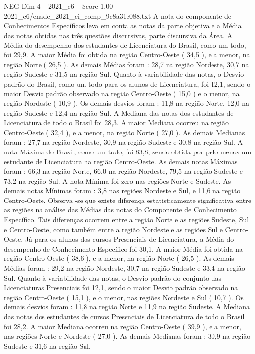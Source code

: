 \begin{textsample}{NEG Dim 4 – 2021\_c6 – Score 1.00 – 2021\_c6/enade\_2021\_ci\_comp\_9c8a31e088.txt}
A nota do componente de Conhecimentos Específicos leva em conta as notas da parte objetiva e a Média das notas obtidas nas três questões discursivas, parte discursiva da Área.
A Média do desempenho dos estudantes de Licenciatura do Brasil, como um todo, foi 29,9.
A maior Média foi obtida na região Centro-Oeste ( 34,5 ), e a menor, na região Norte ( 26,5 ).
As demais Médias foram : 28,7 na região Nordeste, 30,7 na região Sudeste e 31,5 na região Sul.
Quanto à variabilidade das notas, o Desvio padrão do Brasil, como um todo para os alunos de Licenciatura, foi 12,1, sendo o maior Desvio padrão observado na região Centro-Oeste ( 15,0 ) e o menor, na região Nordeste ( 10,9 ).
Os demais desvios foram : 11,8 na região Norte, 12,0 na região Sudeste e 12,4 na região Sul.
A Mediana das notas dos estudantes de Licenciatura de todo o Brasil foi 28,3.
A maior Mediana ocorreu na região Centro-Oeste ( 32,4 ), e a menor, na região Norte ( 27,0 ).
As demais Medianas foram : 27,7 na região Nordeste, 30,9 na região Sudeste e 30,8 na região Sul.
A nota Máxima do Brasil, como um todo, foi 83,8, sendo obtida por pelo menos um estudante de Licenciatura na região Centro-Oeste.
As demais notas Máximas foram : 66,3 na região Norte, 66,0 na região Nordeste, 79,5 na região Sudeste e 73,2 na região Sul.
A nota Mínima foi zero nas regiões Norte e Sudeste.
As demais notas Mínimas foram : 3,8 nas regiões Nordeste e Sul, e 11,6 na região Centro-Oeste.
Observa -se que existe diferença estatisticamente significativa entre as regiões na análise das Médias das notas do Componente de Conhecimento Específico.
Tais diferenças ocorrem entre a região Norte e as regiões Sudeste, Sul e Centro-Oeste, como também entre a região Nordeste e as regiões Sul e Centro-Oeste.
Já para os alunos dos cursos Presenciais de Licenciatura, a Média do desempenho de Conhecimento Específico foi 30,1.
A maior Média foi obtida na região Centro-Oeste ( 38,6 ), e a menor, na região Norte ( 26,5 ).
As demais Médias foram : 29,2 na região Nordeste, 30,7 na região Sudeste e 33,4 na região Sul.
Quanto à variabilidade das notas, o Desvio padrão do conjunto das Licenciaturas Presenciais foi 12,1, sendo o maior Desvio padrão observado na região Centro-Oeste ( 15,1 ), e o menor, nas regiões Nordeste e Sul ( 10,7 ).
Os demais desvios foram : 11,8 na região Norte e 11,9 na região Sudeste.
A Mediana das notas dos estudantes de cursos Presenciais de Licenciatura de todo o Brasil foi 28,2.
A maior Mediana ocorreu na região Centro-Oeste ( 39,9 ), e a menor, nas regiões Norte e Nordeste ( 27,0 ).
As demais Medianas foram : 30,9 na região Sudeste e 31,6 na região Sul.

\end{textsample}
